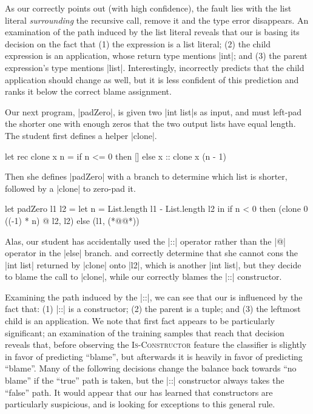 As our \dectree correctly points out (with high confidence), the fault
lies with the list literal \emph{surrounding} the recursive call, remove
it and the type error disappears.
%
An examination of the path induced by the list literal reveals that our
\dectree is basing its decision on the fact that
%
(1) the expression is a list literal;
%
(2) the child expression is an application, whose return type mentions |int|; and
%
(3) the parent expression's type mentions |list|.
%
Interestingly, \dectree incorrectly predicts that the child application
should change as well, but it is less confident of this prediction and
ranks it below the correct blame assignment.

Our next program, |padZero|, is given two |int list|s as input, and must
left-pad the shorter one with enough zeros that the two output lists
have equal length.
%
The student first defines a helper |clone|.
%
\begin{ecode}
  let rec clone x n =
    if n <= 0 then
      []
    else
      x :: clone x (n - 1)
\end{ecode}
%
Then she defines |padZero| with a branch to determine which
list is shorter, followed by a |clone| to zero-pad it.
%
\lstset{firstnumber=last}
\begin{ecode}
  let padZero l1 l2 =
    let n = List.length l1 - List.length l2 in
    if n < 0 then
      (clone 0 ((-1) * n) @ l2, l2)
    else
      (l1, (*@@*))
\end{ecode}
\lstset{firstnumber=1}
%
Alas, our student has accidentally used the |::| operator rather than
the |@| operator in the |else| branch.
%
\sherrloc and \ocaml correctly determine that she cannot cons the
|int list| returned by |clone| onto |l2|, which is another |int list|,
but they decide to blame the call to |clone|, while our
\dectree correctly blames the |::| constructor.

Examining the path induced by the |::|, we can see that our
\dectree is influenced by the fact that:
%
(1) |::| is a constructor; %
%
(2) the parent is a tuple; and
%
(3) the leftmost child is an application.
%
We note that first fact appears to be particularly significant; an
examination of the training samples that reach that decision
reveals that, before observing the \textsc{Is-Constructor} feature the
classifier is slightly in favor of predicting ``blame'', but afterwards
it is heavily in favor of predicting ``blame''.
%
Many of the following decisions change the balance back towards ``no
blame'' if the ``true'' path is taken, but the |::| constructor always
takes the ``false'' path.
%
It would appear that our \dectree has learned that constructors are
particularly suspicious, and is looking for exceptions to this general
rule.
%

